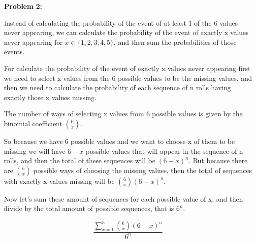 \textbf{Problem 2:}

\singlespacing

Instead of calculating the probability of the event of at least 1 of the 6 values never appearing,
we can calculate the probability of the event of exactly x values never appearing for $x \in \{1, 2, 3, 4, 5\}$,
and then sum the probabilities of those events.

\singlespacing

For calculate the probability of the event of exactly x values never appearing
first we need to select x values from the 6 possible values to be the missing values,
and then we need to calculate the probability of each sequence of n rolls having exactly
those x values missing.

\singlespacing

The number of ways of selecting x values from 6 possible values is given by the binomial coefficient $\binom{6}{x}$.

\singlespacing

So because we have 6 possible values and we want to choose x of them to be missing we will
have $6 - x$ possible values that will appear in the sequence of n rolls,
and then the total of these sequences will be $(6 - x)^n$. But because there are $\binom{6}{x}$
possible ways of choosing the missing values, then the total of sequences with exactly x values
missing will be $\binom{6}{x} (6 - x)^n$.

\singlespacing

Now let's sum these amount of sequences for each possible value of x, and then
divide by the total amount of possible sequences, that is $6^n$.

\singlespacing

\begin{equation}
    \frac{\sum_{x=1}^{5} \binom{6}{x} (6 - x)^n}{6^n}
\end{equation}

\singlespacing
